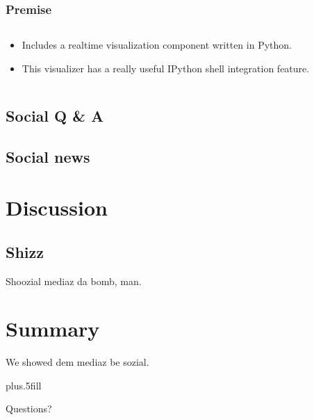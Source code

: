 \documentclass{beamer}
\begin{document}
\begin{frame}
  \frametitle{Premise}

  \begin{columns}[T]
    \begin{column}{.5\textwidth}
      \begin{itemize}
      \item Includes a realtime visualization component written in Python.

      \item This visualizer has a really useful IPython shell integration
        feature.


      \end{itemize}

    \end{column}
    \begin{column}{.5\textwidth}
    \end{column}
  \end{columns}
\end{frame}

\subsection{Social Q \&{} A}

\subsection{Social news}


\section{Discussion}

\subsection{Shizz}

\begin{frame}
  Shoozial mediaz da bomb, man.
\end{frame}

\section*{Summary}

\begin{frame}
  We showed dem mediaz be sozial.

  
  \pause
  \vskip0pt plus.5fill

  Questions?
\end{frame}
\end{document}
